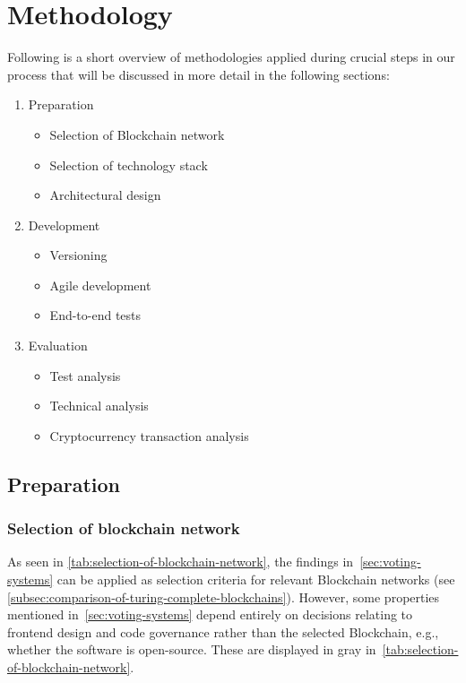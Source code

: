 \chapter{Methodology}\label{ch:methodology}

Following is a short overview of methodologies applied during crucial steps in our process that will be discussed in more detail in the following sections:

\begin{enumerate}
    \item Preparation
    \begin{itemize}
        \item Selection of \gls{Blockchain} network
        \item Selection of technology stack
        \item Architectural design
    \end{itemize}
    \item Development
    \begin{itemize}
        \item Versioning
        \item Agile development
        \item End-to-end tests
    \end{itemize}
    \item Evaluation
    \begin{itemize}
        \item Test analysis
        \item Technical analysis
        \item Cryptocurrency transaction analysis
    \end{itemize}
\end{enumerate}

\section{Preparation}\label{sec:preparation}

\subsection{Selection of blockchain network}\label{subsec:selection-of-blockchain-network}

As seen in \cref{tab:selection-of-blockchain-network}, the findings in~\cref{sec:voting-systems} can be applied as selection criteria for relevant \gls{Blockchain} networks (see \cref{subsec:comparison-of-turing-complete-blockchains}).
However, some properties mentioned in~\cref{sec:voting-systems} depend entirely on decisions relating to frontend design and code governance rather than the selected \gls{Blockchain}, e.g., whether the software is open-source.
These are displayed in gray in~\cref{tab:selection-of-blockchain-network}.

